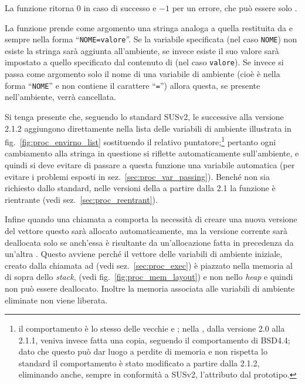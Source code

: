 \begin{funcproto}{ 
}
{La funzione ritorna $0$ in caso di successo e $-1$ per un errore, che può
  essere solo .}
\end{funcproto}

La funzione prende come argomento una stringa analoga a quella restituita da
 e sempre nella forma ``\texttt{NOME=valore}''. Se la variabile
specificata (nel caso \texttt{NOME}) non esiste la stringa sarà aggiunta
all'ambiente, se invece esiste il suo valore sarà impostato a quello
specificato dal contenuto di  (nel caso \texttt{valore}).  Se
invece si passa come argomento solo il nome di una variabile di ambiente
(cioè  è nella forma ``\texttt{NOME}'' e non contiene il
carattere ``\texttt{=}'') allora questa, se presente nell'ambiente, verrà
cancellata.

Si tenga presente che, seguendo lo standard SUSv2, le  successive
alla versione 2.1.2 aggiungono direttamente  nella lista delle
variabili di ambiente illustrata in fig.~\ref{fig:proc_envirno_list}
sostituendo il relativo puntatore;\footnote{il comportamento è lo stesso delle
  vecchie  e ; nella , dalla versione 2.0
  alla 2.1.1, veniva invece fatta una copia, seguendo il comportamento di
  BSD4.4; dato che questo può dar luogo a perdite di memoria e non rispetta lo
  standard il comportamento è stato modificato a partire dalla 2.1.2,
  eliminando anche, sempre in conformità a SUSv2, l'attributo 
  dal prototipo.}  pertanto ogni cambiamento alla stringa in questione si
riflette automaticamente sull'ambiente, e quindi si deve evitare di passare a
questa funzione una variabile automatica (per evitare i problemi esposti in
sez.~\ref{sec:proc_var_passing}). Benché non sia richiesto dallo standard,
nelle versioni della  a partire dalla 2.1 la funzione è rientrante
(vedi sez.~\ref{sec:proc_reentrant}).

Infine quando una chiamata a  comporta la necessità di creare una
nuova versione del vettore  questo sarà allocato automaticamente,
ma la versione corrente sarà deallocata solo se anch'essa è risultante da
un'allocazione fatta in precedenza da un'altra . Questo avviene
perché il vettore delle variabili di ambiente iniziale, creato dalla chiamata
ad  (vedi sez.~\ref{sec:proc_exec}) è piazzato nella memoria al di
sopra dello \textit{stack}, (vedi fig.~\ref{fig:proc_mem_layout}) e non nello
\textit{heap} e quindi non può essere deallocato.  Inoltre la memoria
associata alle variabili di ambiente eliminate non viene liberata.


